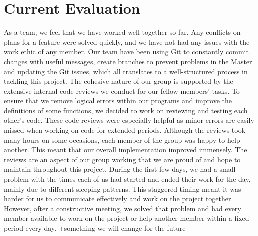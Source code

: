 \documentclass[11pt]{article}
\begin{document}
\section*{Current Evaluation}
As a team, we feel that we have worked well together so far. Any conflicts on plans for a feature were solved
quickly, and we have not had any issues with the work ethic of any member. Our team have been using Git to
constantly commit changes with useful messages, create branches to prevent problems in the Master and
updating the Git issues, which all translates to a well-structured process in tackling this project.
The cohesive nature of our group is supported by the extensive internal code reviews we conduct for our
fellow members’ tasks. To ensure that we remove logical errors within our programs and improve the
definitions of some functions, we decided to work on reviewing and testing each other’s code. These code
reviews were especially helpful as minor errors are easily missed when working on code for extended periods.
Although the reviews took many hours on some occasions, each member of the group was happy to help
another. This meant that our overall implementation improved immensely. The reviews are an aspect of our
group working that we are proud of and hope to maintain throughout this project.
During the first few days, we had a small problem with the times each of us had started and ended their work
for the day, mainly due to different sleeping patterns. This staggered timing meant it was harder for us to
communicate effectively and work on the project together. However, after a constructive meeting, we solved
that problem and had every member available to work on the project or help another member within a fixed
period every day.
+something we will change for the future 
\end{document}
